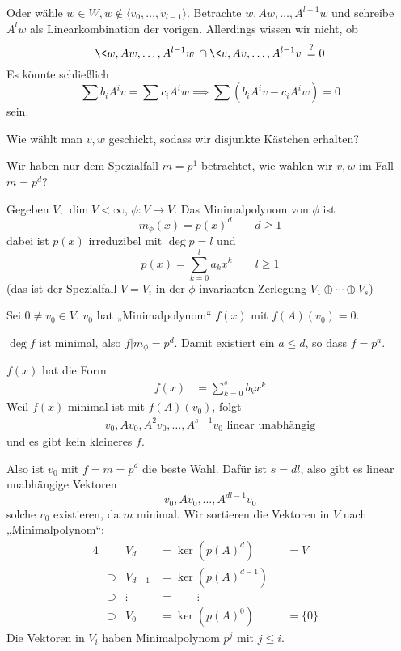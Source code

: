 \documentclass[a4paper, 10pt]{scrbook}
\begin{document}
\begin{ex}
\begin{enumerate}[1{. Schritt}]
			Oder wähle $w\in W, w\not\in \langle v_0,\dotsc, v_{l-1} \rangle$.
			Betrachte $w,Aw,\dotsc, A^{l-1}w$ und schreibe $A^lw$ als Linearkombination der vorigen.
			Allerdings wissen wir nicht, ob
			\[
				\<w,Aw,\dotsc,A^{l-1}w\> \cap \<v,Av,\dotsc,A^{l-1}v\> \stackrel ?= 0
			\]
			Es könnte schließlich
			\[
				\sum b_i A^i v = \sum c_iA^i w \implies \sum (b_iA^iv - c_i A^i w) = 0
			\]
			sein.

			Wie wählt man $v,w$ geschickt, sodass wir disjunkte Kästchen erhalten?
			
			Wir haben nur dem Spezialfall $m=p^1$ betrachtet, wie wählen wir $v,w$ im Fall $m=p^d$?
	\end{enumerate}
	
	Gegeben $V$, $\dim V<\infty$, $\phi: V\to V$.
	Das Minimalpolynom von $\phi$ ist
	\[
		m_\phi(x) = p(x)^d \qquad d\ge 1
	\]
	dabei ist $p(x)$ irreduzibel mit $\deg p = l$ und
	\[
		p(x) = \sum_{k=0}^l a_k x^k \qquad l\ge 1
	\]
	(das ist der Spezialfall $V=V_i$ in der $\phi$-invarianten Zerlegung $V_1\oplus\dotsb\oplus V_s$)

	Sei $0\neq v_0\in V$.
	$v_0$ hat „Minimalpolynom“ $f(x)$ mit $f(A)(v_0) = 0$.

	$\deg f$ ist minimal, also $f|m_\phi = p^d$.
	Damit existiert ein $a\le d$, so dass $f=p^a$.
	
	$f(x)$ hat die Form
	\begin{align*}
		f(x)&=\sum_{k=0}^s b_kx^k
	\end{align*}
	Weil $f(x)$ minimal ist mit $f(A)(v_0)$, folgt
	\begin{align*}
		v_0, Av_0, A^2v_0, \dotsc, A^{s-1}v_0 \text{ linear unabhängig}
	\end{align*}
	und es gibt kein kleineres $f$.

	Also ist $v_0$ mit $f=m=p^d$ die beste Wahl.
	Dafür ist $s=dl$, also gibt es linear unabhängige Vektoren
	\[
		v_0, Av_0, \dotsc, A^{dl-1}v_0
	\]
	solche $v_0$ existieren, da $m$ minimal.
	Wir sortieren die Vektoren in $V$ nach „Minimalpolynom“:
	\begin{alignat*}{4}
		&		&V_d&= \ker(p(A)^d)& &= V \\
  &\supset &V_{d-1} &= \ker(p(A)^{d-1})& \\
	 &\supset &\vdots\;&=\qquad \vdots &&\\
		&\supset &V_0 &= \ker(p(A)^0) &&= \{0\}
	 &\end{alignat*}
	Die Vektoren in $V_i$ haben Minimalpolynom $p^j$ mit $j\le i$.

\end{ex}
\end{document}
